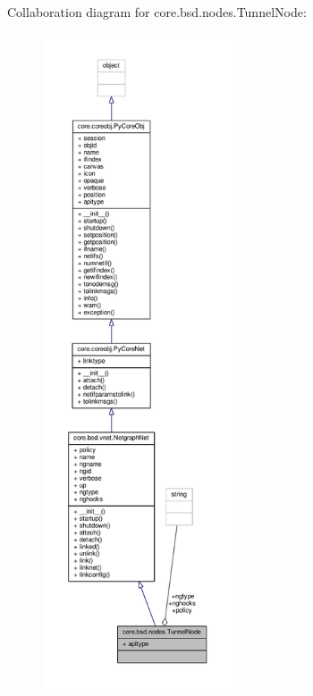 Collaboration diagram for core.\+bsd.\+nodes.\+Tunnel\+Node\+:
\nopagebreak
\begin{figure}[H]
\begin{center}
\leavevmode
\includegraphics[height=550pt]{classcore_1_1bsd_1_1nodes_1_1_tunnel_node__coll__graph}
\end{center}
\end{figure}
